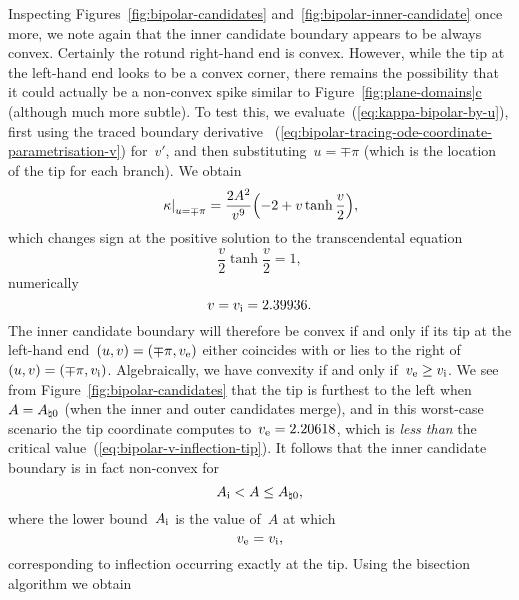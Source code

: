 Inspecting
Figures~\ref{fig:bipolar-candidates} and~\ref{fig:bipolar-inner-candidate}
once more,
we note again that
the inner candidate boundary appears to be always convex.
Certainly the rotund right-hand end is convex.
However, while the tip at the left-hand end looks to be a convex corner,
there remains the possibility
that it could actually be a non-convex spike
similar to Figure~\hyperref[fig:plane-domains]{\ref*{fig:plane-domains}c}
(although much more subtle).
To test this,
we evaluate~(\ref{eq:kappa-bipolar-by-u}),
first using the traced boundary derivative~%
  (\ref{eq:bipolar-tracing-ode-coordinate-parametrisation-v})
for~$v'$,
and then substituting~$u = \mp\pi$
(which is the location of the tip for each branch).
We obtain
\begin{equation}
  \eval*{\kappa}_{u = \mp\pi} =
    \frac{2 A^2}{v^9}
    \roundbr*{-2 + v \tanh\frac{v}{2}},
    \label{eq:bipolar-traced-boundary-kappa-bipolar-by-u-tip}
\end{equation}
which changes sign at the positive solution to the transcendental equation
\begin{equation}
  \frac{v}{2} \tanh\frac{v}{2} = 1,
\end{equation}
numerically
\begin{equation}
  v = v_{\mathrm{i}} = 2.39936.
  \label{eq:bipolar-v-inflection-tip}
\end{equation}
The inner candidate boundary will therefore be convex
if and only if its tip at the left-hand end~$(u, v) = (\mp\pi, v_{\mathrm{e}})$
either coincides with or lies to the right of~$(u, v) = (\mp\pi, v_{\mathrm{i}})$.
Algebraically, we have convexity if and only if~$v_{\mathrm{e}} \ge v_{\mathrm{i}}$.
We see from Figure~\ref{fig:bipolar-candidates}
that the tip is furthest to the left when~$A = A_{\natural 0}$
(when the inner and outer candidates merge),
and in this worst-case scenario
the tip coordinate computes to~$v_{\mathrm{e}} = 2.20618$,
which is \emph{less than}
the critical value~(\ref{eq:bipolar-v-inflection-tip}).
It follows that the inner candidate boundary is in fact non-convex for
\begin{equation}
  A_{\mathrm{i}} < A \le A_{\natural 0},
  \label{eq:bipolar-inner-candidate-non-convex-a-interval}
\end{equation}
where the lower bound~$A_{\mathrm{i}}$ is the value of~$A$ at which
\begin{equation}
  v_{\mathrm{e}} = v_{\mathrm{i}},
  \label{eq:bipolar-inner-candidate-a-inflection-equation}
\end{equation}
corresponding to inflection occurring exactly at the tip.
Using the bisection algorithm we obtain
